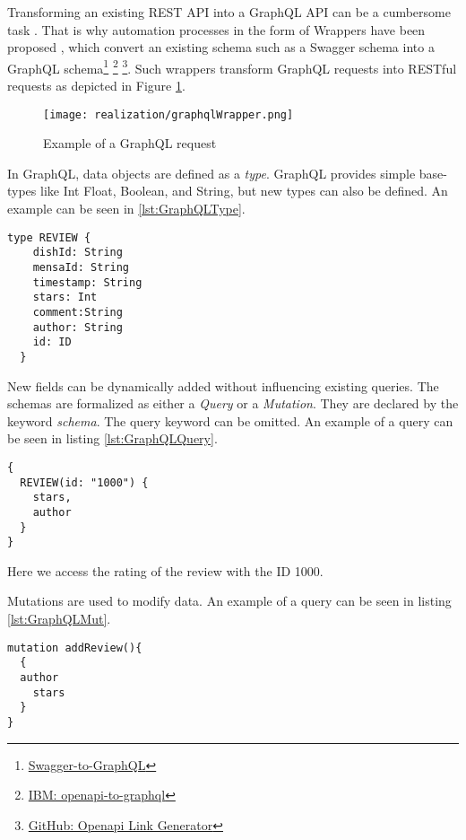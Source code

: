 Transforming an existing REST API into a GraphQL API can be a cumbersome task \cite{WCL18}. That is why automation processes in the form of Wrappers have been proposed \cite{KKK20}, which convert an existing schema such as a Swagger schema into a GraphQL schema\footnote{\href{https://github.com/yarax/swagger-to-graphql}{Swagger-to-GraphQL}} \footnote{\href{https://github.com/IBM/openapi-to-graphql}{IBM: openapi-to-graphql}} \footnote{\href{https://github.com/rwth-acis/openapi-link-generator}{GitHub: Openapi Link Generator}}.   Such wrappers transform GraphQL requests into RESTful requests as depicted in Figure \ref{fig:graphqlWrapper}.
\begin{figure}
    \centering
    \texttt{[image: realization/graphqlWrapper.png]}
    \caption{Example of a GraphQL request}
    \label{fig:graphqlWrapper}
\end{figure}

In GraphQL, data objects are defined as a \emph{type}. GraphQL provides simple base-types like Int Float, Boolean, and String, but new types can also be defined. An example can be seen in \ref{lst:GraphQLType}. \\
\begin{lstlisting}[caption={Example of a GraphQL schema},captionpos=b,label={lst:GraphQLType}]
  type REVIEW { 
    dishId: String 
    mensaId: String 
    timestamp: String 
    stars: Int 
    comment:String
    author: String 
    id: ID 
  }
\end{lstlisting}
New fields can be dynamically added without influencing existing queries. The schemas are formalized as either a \emph{Query} or a \emph{Mutation}. They are declared by the keyword \emph{schema}. The query keyword can be omitted. An example of a query can be seen in listing \ref{lst:GraphQLQuery}.
\begin{lstlisting}[caption={Example of a GraphQL Query},captionpos=b,label={lst:GraphQLQuery}]
{
  REVIEW(id: "1000") {
    stars,
    author
  }
}
\end{lstlisting}
Here we access the rating of the review with the ID 1000.

Mutations are used to modify data. An example of a query can be seen in listing \ref{lst:GraphQLMut}.
\begin{lstlisting}[caption={Example of a GraphQL Mutation},captionpos=b,label={lst:GraphQLMut}]
mutation addReview(){
  {
  author
	stars 
  }
}
\end{lstlisting}

